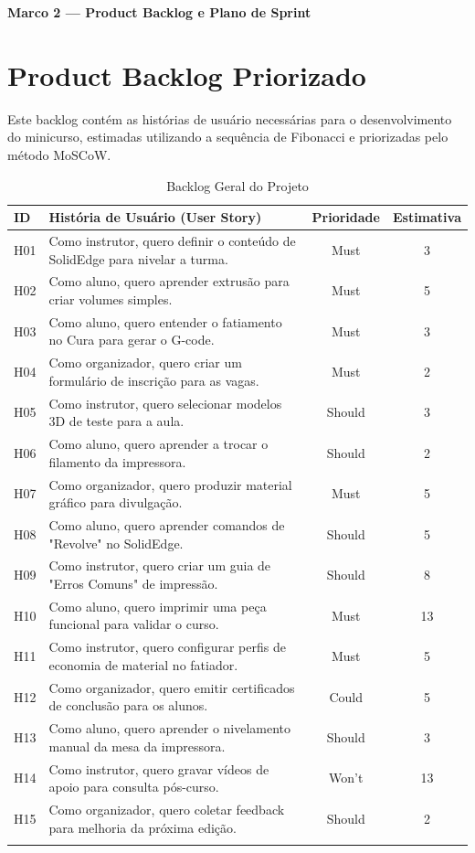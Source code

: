 \documentclass[12pt, a4paper]{article}
\begin{document}
\begin{center}
    {\Large\bfseries Marco 2 --- Product Backlog e Plano de Sprint}\\
\end{center}

\section{Product Backlog Priorizado}
Este backlog contém as histórias de usuário necessárias para o desenvolvimento do minicurso, estimadas utilizando a sequência de Fibonacci e priorizadas pelo método MoSCoW.

\begin{longtable}{lp{9cm}cc}
\toprule
\textbf{ID} & \textbf{História de Usuário (User Story)} & \textbf{Prioridade} & \textbf{Estimativa} \\
\midrule
H01 & Como instrutor, quero definir o conteúdo de SolidEdge para nivelar a turma. & Must & 3 \\
H02 & Como aluno, quero aprender extrusão para criar volumes simples. & Must & 5 \\
H03 & Como aluno, quero entender o fatiamento no Cura para gerar o G-code. & Must & 3 \\
H04 & Como organizador, quero criar um formulário de inscrição para as vagas. & Must & 2 \\
H05 & Como instrutor, quero selecionar modelos 3D de teste para a aula. & Should & 3 \\
H06 & Como aluno, quero aprender a trocar o filamento da impressora. & Should & 2 \\
H07 & Como organizador, quero produzir material gráfico para divulgação. & Must & 5 \\
H08 & Como aluno, quero aprender comandos de "Revolve" no SolidEdge. & Should & 5 \\
H09 & Como instrutor, quero criar um guia de "Erros Comuns" de impressão. & Should & 8 \\
H10 & Como aluno, quero imprimir uma peça funcional para validar o curso. & Must & 13 \\
H11 & Como instrutor, quero configurar perfis de economia de material no fatiador. & Must & 5 \\
H12 & Como organizador, quero emitir certificados de conclusão para os alunos. & Could & 5 \\
H13 & Como aluno, quero aprender o nivelamento manual da mesa da impressora. & Should & 3 \\
H14 & Como instrutor, quero gravar vídeos de apoio para consulta pós-curso. & Won't & 13 \\
H15 & Como organizador, quero coletar feedback para melhoria da próxima edição. & Should & 2 \\
\bottomrule
\caption{Backlog Geral do Projeto}
\end{longtable}
\end{document}
